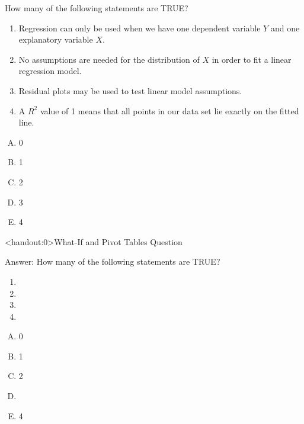 \documentclass[xcolor=svgnames]{beamer}
\begin{document}
\begin{frame}
  \begin{example}
 How many of the following statements are TRUE?
 \begin{enumerate}
\item Regression can only be used when we have one dependent variable $Y$ and one explanatory variable $X$.
\item No assumptions are needed for the distribution of $X$ in order to fit a linear regression model.
\item Residual plots may be used to test linear model assumptions.
\item A $R^2$ value of 1 means that all points in our data set lie exactly on the fitted line.
 \end{enumerate}
\begin{multicols}{5}
\begin{enumerate}[A)]
\item 0 
\item 1
\item 2
\item 3
\item 4
\end{enumerate}
\end{multicols}
  \end{example} 
\end{frame}

\begin{frame}<handout:0>{What-If and Pivot Tables Question}
  \begin{block}{Answer:}
 How many of the following statements are TRUE?
 \begin{enumerate}
\item {}
\item {}
\item {}
\item {}
 \end{enumerate}
\begin{multicols}{5}
\begin{enumerate}[A)]
\item 0 
\item 1
\item 2
\item \textbf<4>{\textit<4>{{}}}
\item 4
\end{enumerate}
\end{multicols}
  \end{block} 
\end{frame}
\end{document}
